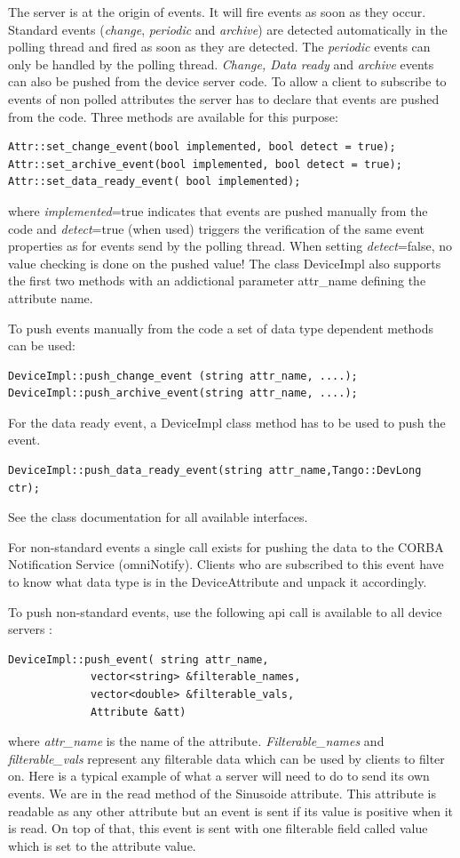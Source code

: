 The server is at the origin of events. It will fire
events as soon as they occur. Standard events (\emph{change}, \emph{periodic}
and \emph{archive}) are detected automatically in the polling thread
and fired as soon as they are detected. The \emph{periodic} events
can only be handled by the polling thread. \emph{Change, Data ready}
and \emph{archive} events can also be pushed from the device server
code. To allow a client to subscribe to events of non polled attributes
the server has to declare that events are pushed from the code. Three
methods are available for this purpose:
\begin{verbatim}
Attr::set_change_event(bool implemented, bool detect = true);
Attr::set_archive_event(bool implemented, bool detect = true);
Attr::set_data_ready_event( bool implemented);
\end{verbatim}
where \emph{implemented}=true indicates that events are pushed manually
from the code and \emph{detect}=true (when used) triggers the verification
of the same event properties as for events send by the polling thread.
When setting \emph{detect}=false, no value checking is done on the
pushed value! The class DeviceImpl also supports the first two methods
with an addictional parameter attr\_name defining the attribute name.

To push events manually from the code a set of data type dependent
methods can be used:
\begin{verbatim}
DeviceImpl::push_change_event (string attr_name, ....);
DeviceImpl::push_archive_event(string attr_name, ....);
\end{verbatim}
For the data ready event, a DeviceImpl class method has to be used
to push the event.
\begin{verbatim}
DeviceImpl::push_data_ready_event(string attr_name,Tango::DevLong ctr);
\end{verbatim}
See the class documentation for all available interfaces.

For non-standard events a single call exists for pushing the data
to the CORBA Notification Service (omniNotify). Clients who are subscribed
to this event have to know what data type is in the DeviceAttribute
and unpack it accordingly.

To push non-standard events, use the following api call is available
to all device servers :
\begin{verbatim}
DeviceImpl::push_event( string attr_name,
             vector<string> &filterable_names,
             vector<double> &filterable_vals,
             Attribute &att)
\end{verbatim}
where \emph{attr\_name} is the name of the attribute\emph{. Filterable\_names}
and \emph{filterable\_vals} represent any filterable data which can
be used by clients to filter on. Here is a typical example of what
a server will need to do to send its own events. We are in the read
method of the \textquotedbl{}Sinusoide\textquotedbl{} attribute. This
attribute is readable as any other attribute but an event is sent
if its value is positive when it is read. On top of that, this event
is sent with one filterable field called \textquotedbl{}value\textquotedbl{}
which is set to the attribute value.


